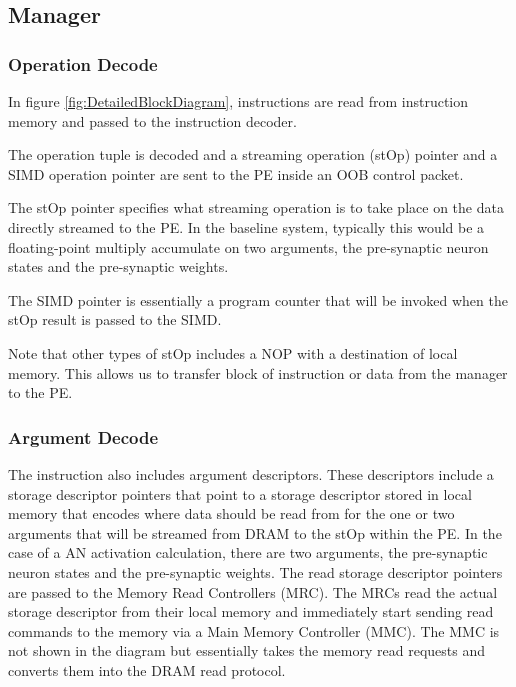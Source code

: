 \documentclass[journal]{IEEEtran}
\begin{document}
\subsection{Manager}
\label{sec:manager}

\subsubsection{Operation Decode}
\label{ssec:operationDecode}

In figure \ref{fig:DetailedBlockDiagram}, instructions are read from instruction memory and passed to the instruction decoder.

The operation tuple is decoded and a streaming operation (stOp) pointer and a SIMD operation pointer are sent to the PE inside an OOB control packet.

The stOp pointer specifies what streaming operation is to take place on the data directly streamed to the PE. In the baseline system, typically this would be a floating-point multiply accumulate on two arguments, the pre-synaptic neuron states and the pre-synaptic weights.

The SIMD pointer is essentially a program counter that will be invoked when the stOp result is passed to the SIMD.

Note that other types of stOp includes a NOP with a destination of local memory. This allows us to transfer block of instruction or data from the manager to the PE.


\subsubsection{Argument Decode}
\label{ssec:argumentDecode}
The instruction also includes argument descriptors. These descriptors include a storage descriptor pointers that point to a storage descriptor stored in local memory that encodes where data should be read from for the one or two arguments that will be streamed from DRAM to the stOp within the PE. In the case of a AN activation calculation, there are two arguments, the pre-synaptic neuron states and the pre-synaptic weights. The read storage descriptor pointers are passed to the Memory Read Controllers (MRC). The MRCs read the actual storage descriptor from their local memory and immediately start sending read commands to the memory via a Main Memory Controller (MMC). The MMC is not shown in the diagram but essentially takes the memory read requests and converts them into the DRAM read protocol.
\end{document}
